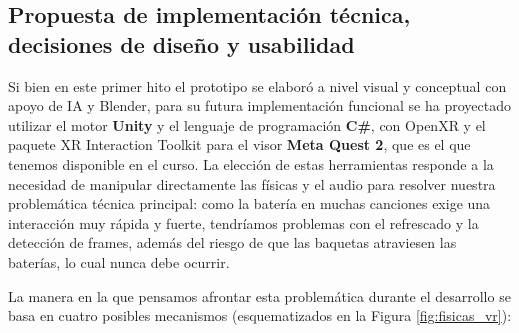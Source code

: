\documentclass{article}
\begin{document}
\subsection{Propuesta de implementación técnica, decisiones de diseño y usabilidad}
Si bien en este primer hito el prototipo se elaboró a nivel visual y conceptual con apoyo de IA y Blender, para su futura implementación funcional se ha proyectado utilizar el motor \textbf{Unity} y el lenguaje de programación \textbf{C\#}, con OpenXR y el paquete XR Interaction Toolkit para el visor \textbf{Meta Quest 2}, que es el que tenemos disponible en el curso. La elección de estas herramientas responde a la necesidad de manipular directamente las físicas y el audio para resolver nuestra problemática técnica principal: como la batería en muchas canciones exige una interacción muy rápida y fuerte, tendríamos problemas con el refrescado y la detección de frames, además del riesgo de que las baquetas atraviesen las baterías, lo cual nunca debe ocurrir.

La manera en la que pensamos afrontar esta problemática durante el desarrollo se basa en cuatro posibles mecanismos (esquematizados en la Figura \ref{fig:fisicas_vr}):
\end{document}
